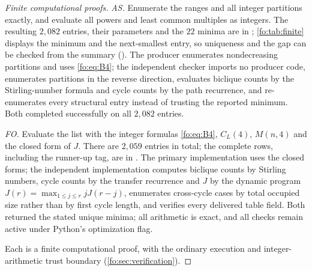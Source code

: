 \documentclass[11pt,a4paper]{article}
\numberwithin{equation}{section}
\theoremstyle{definition}
\theoremstyle{remark}
\begin{document}
\begin{proof}[Finite computational proofs]
\emph{AS.} Enumerate the ranges and all integer partitions exactly, and
evaluate all powers and least common multiples as integers. The resulting
$2{,}082$ entries, their parameters and the $22$ minima are in
;
\cref{fo:tab:finite} displays the minimum and the next-smallest entry, so
uniqueness and the gap can be checked from the summary
(). The producer
 enumerates nondecreasing partitions and
uses \eqref{fo:eq:B4}; the independent checker
 imports no producer code,
enumerates partitions in the reverse direction, evaluates biclique counts by
the Stirling-number formula and cycle counts by the path recurrence, and
re-enumerates every structural entry instead of trusting the reported
minimum. Both completed successfully on all $2{,}082$ entries.

\emph{FO.} Evaluate the list with the integer formulas \eqref{fo:eq:B4},
$C_L(4)$, $M(n,4)$ and the closed form of $J$. There are $2{,}059$ entries in
total; the complete rows, including the runner-up tag, are in
. The primary implementation
 uses the closed forms; the independent
implementation  computes
biclique counts by Stirling numbers, cycle counts by the transfer recurrence
and $J$ by the dynamic program $J(r)=\max_{1\le j\le r}jJ(r-j)$, enumerates
cross-cycle cases by total occupied size rather than by first cycle length,
and verifies every delivered table field. Both returned the stated unique
minima; all arithmetic is exact, and all checks remain active under Python's
optimization flag.

Each is a finite computational proof, with the ordinary execution and
integer-arithmetic trust boundary (\cref{fo:sec:verification}).
\end{proof}
\end{document}
